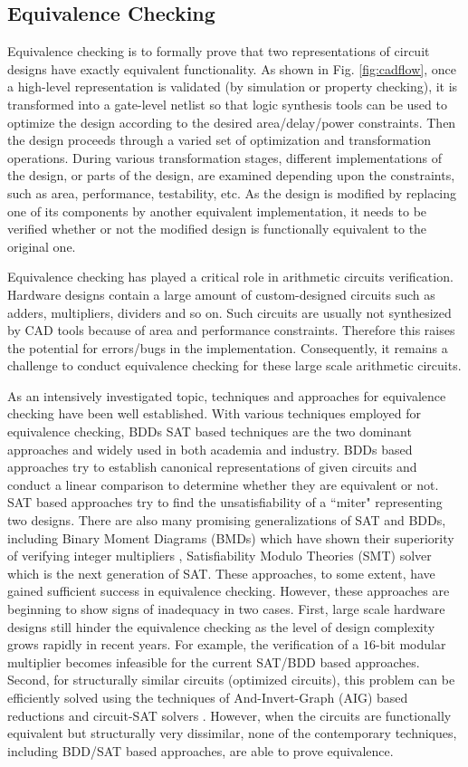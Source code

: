 \subsection{Equivalence Checking}
Equivalence checking is to formally prove that two representations of circuit designs have exactly equivalent functionality. 
As shown in Fig. \ref{fig:cadflow}, once a high-level representation is validated (by simulation or property checking), 
it is transformed into a gate-level netlist so that logic synthesis tools can be used to optimize the design
according to the desired area/delay/power constraints. Then the design proceeds through a varied set of
optimization and transformation operations. 
During various transformation stages, different 
implementations of the design, or parts of the design, are examined
depending upon the constraints, such as area, performance,
testability, etc. As the design is modified by replacing one of its
components  by another equivalent implementation, it needs to be
verified whether or not the modified design is functionally
equivalent to the original one.

Equivalence checking has played a critical role in arithmetic circuits verification.   
Hardware designs contain a large amount of custom-designed circuits such as adders, multipliers, dividers and so on. 
Such circuits are usually not synthesized by CAD tools because of area and performance constraints.
Therefore this raises the potential for errors/bugs in the implementation.
Consequently, it remains a challenge to conduct equivalence checking for these large scale arithmetic circuits.

As an intensively investigated topic, techniques and approaches for equivalence checking have been well established. 
With various techniques employed for equivalence checking, BDDs SAT based techniques are the two dominant approaches and 
widely used in both academia and industry. 
BDDs based approaches try to establish canonical representations of given circuits and 
conduct a linear comparison to determine whether they are equivalent or not.
SAT based approaches try to find the unsatisfiability of a ``miter" representing two designs.
There are also many promising generalizations of SAT and BDDs, 
including Binary Moment Diagrams (BMDs) which have shown their superiority of verifying integer multipliers \cite{bmd}, 
Satisfiability Modulo Theories (SMT) solver which is the next generation of SAT.
These approaches, to some extent, have gained sufficient success in equivalence checking.
However, these approaches are beginning to show signs of inadequacy in two cases. 
First, large scale hardware designs still hinder the equivalence checking as the level of design complexity grows rapidly in recent years. 
For example, the verification of a $16$-bit modular multiplier becomes infeasible for the current SAT/BDD based approaches.
Second, for structurally similar circuits (optimized circuits), this problem can
be efficiently solved using the techniques of And-Invert-Graph (AIG) based reductions \cite{abc} and circuit-SAT solvers \cite{csat}.
However, when the circuits are functionally equivalent but structurally very dissimilar, 
none of the contemporary techniques, including BDD/SAT based approaches, are able to prove equivalence. 

